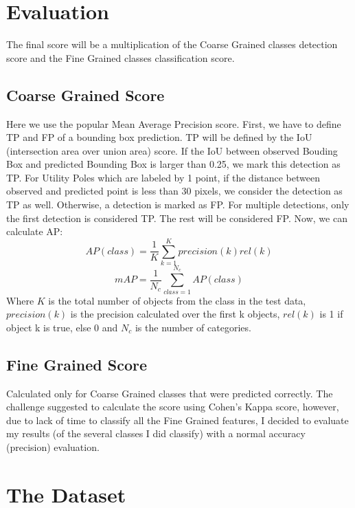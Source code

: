 \documentclass[]{article}
\begin{document}
\section{Evaluation}
The final score will be a multiplication of the Coarse Grained classes detection score and the Fine Grained classes classification score.

\subsection{Coarse Grained Score}
Here we use the popular Mean Average Precision score. First, we have to define TP and FP of a bounding box prediction. TP will be defined by the IoU (intersection area over union area) score. If the IoU between observed Bouding Box and predicted Bounding Box is larger than 0.25, we mark this detection as TP. For Utility Poles which are labeled by 1 point, if the distance between observed and predicted point is less than 30 pixels, we consider the detection as TP as well. Otherwise, a detection is marked as FP. For multiple detections, only the first detection is considered TP. The rest will be considered FP. Now, we can calculate AP:\\
$$AP(class)=\frac{1}{K}\sum_{k=1}^{K}precision(k)rel(k)$$
$$mAP=\frac{1}{N_c}\sum_{class=1}^{N_c}AP(class)$$
Where $K$ is the total number of objects from the class in the test data, $precision(k)$ is the precision calculated over the first k objects, $rel(k)$ is 1 if object k is true, else 0 and $N_c$ is the number of categories.

\subsection{Fine Grained Score}
Calculated only for Coarse Grained classes that were predicted correctly.
The challenge suggested to calculate the score using Cohen's Kappa score, however, due to lack of time to classify all the Fine Grained features, I decided to evaluate my results (of the several classes I did classify) with a normal accuracy (precision) evaluation.

\section{The Dataset}
\end{document}
